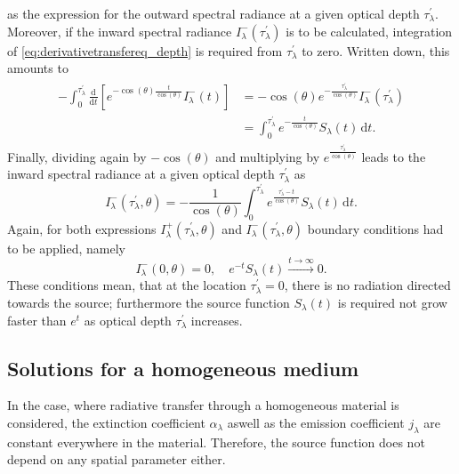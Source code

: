 \documentclass[a4paper,12pt]{report}
\begin{document}
as the expression for the outward spectral radiance at a given optical depth $\tau_\lambda^\prime$. Moreover, if the inward spectral radiance $I^-_\lambda(\tau_\lambda^\prime)$ is to be calculated, integration of \cref{eq:derivativetransfereq_depth} is required from $\tau_\lambda^\prime$ to zero. Written down, this amounts to \begin{align}\begin{aligned}
-\int_{0}^{\tau_\lambda^\prime}\frac{\mathrm{d}}{\mathrm{d}t}\left[e^{-\cos(\theta)\frac{t}{\cos(\theta)}}I_\lambda^-(t)\right] &= -\cos(\theta)e^{-\frac{\tau_\lambda^\prime}{\cos(\theta)}}I_\lambda^-(\tau_\lambda^\prime) \\ &= \int_{0}^{\tau_\lambda^\prime}e^{-\frac{t}{\cos(\theta)}}S_\lambda(t)\,\mathrm{d}t.
\end{aligned}\end{align} Finally, dividing again by $-\cos(\theta)$ and multiplying by $e^{\frac{\tau_\lambda^\prime}{\cos(\theta)}}$ leads to the inward spectral radiance at a given optical depth $\tau_\lambda^\prime$ as \begin{equation}\label{eq:formaltransferequationinward_depth}
I_\lambda^-(\tau_\lambda^\prime,\theta) = -\frac{1}{\cos(\theta)}\int_{0}^{\tau_\lambda^\prime}e^{\frac{\tau_\lambda^\prime-t}{\cos(\theta)}}S_\lambda(t)\,\mathrm{d}t.
\end{equation} Again, for both expressions $I_\lambda^+(\tau_\lambda^\prime,\theta)$ and $I_\lambda^-(\tau_\lambda^\prime,\theta)$ boundary conditions had to be applied, namely \begin{equation}
I_\lambda^-(0,\theta) = 0, \quad e^{-t}S_\lambda(t) \xrightarrow{t\rightarrow \infty} 0.
\end{equation} These conditions mean, that at the location $\tau_\lambda^\prime = 0$, there is no radiation directed towards the source; furthermore the source function $S_\lambda(t)$ is required not grow faster than $e^{t}$ as optical depth $\tau^\prime_\lambda$ increases.

\subsection{Solutions for a homogeneous medium}
In the case, where radiative transfer through a homogeneous material is considered, the extinction coefficient $\alpha_\lambda$ aswell as the emission coefficient $j_\lambda$ are constant everywhere in the material. Therefore, the source function does not depend on any spatial parameter either.
\end{document}
